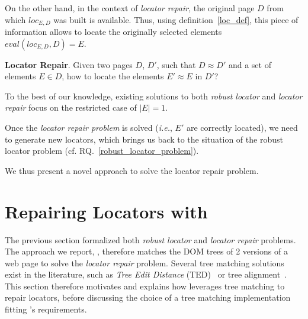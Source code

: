 On the other hand, in the context of \textit{locator repair}, the original page $D$ from which $loc_{E,D}$ was built is available.
Thus, using definition~\ref{loc_def}, this piece of information allows to locate the originally selected elements $eval(loc_{E,D}, D) = E$.

\begin{rqn}\label{locator_repair_problem}
    \textbf{Locator Repair}. 
    Given two pages $D$, $D'$, such that $D \approx D'$ and a set of elements $E\in D$, how to locate the elements $E' \approx E$ in $D'$?
\end{rqn}
To the best of our knowledge, existing solutions to both \emph{robust locator} and \emph{locator repair} focus on the restricted case of $|E| = 1$.

Once the \textit{locator repair problem} is solved (\emph{i.e.}, $E'$ are correctly located), we need to generate new locators, which brings us back to the situation of the robust locator problem (cf. RQ.~\ref{robust_locator_problem}).

We thus present a novel approach to solve the locator repair problem.


\section{Repairing Locators with \erratum}\label{sec:implementation}
The previous section formalized both \emph{robust locator} and \emph{locator repair} problems.
The approach we report, \erratum, therefore matches the DOM trees of 2 versions of a web page to solve the \emph{locator repair} problem.
Several tree matching solutions exist in the literature, such as \emph{Tree Edit Distance} (TED)~\cite{tai1979tree} or tree alignment~\cite{jiang1994alignment}.
This section therefore motivates and explains how \erratum leverages tree matching to repair locators, before discussing the choice of a tree matching implementation fitting \erratum's requirements.

